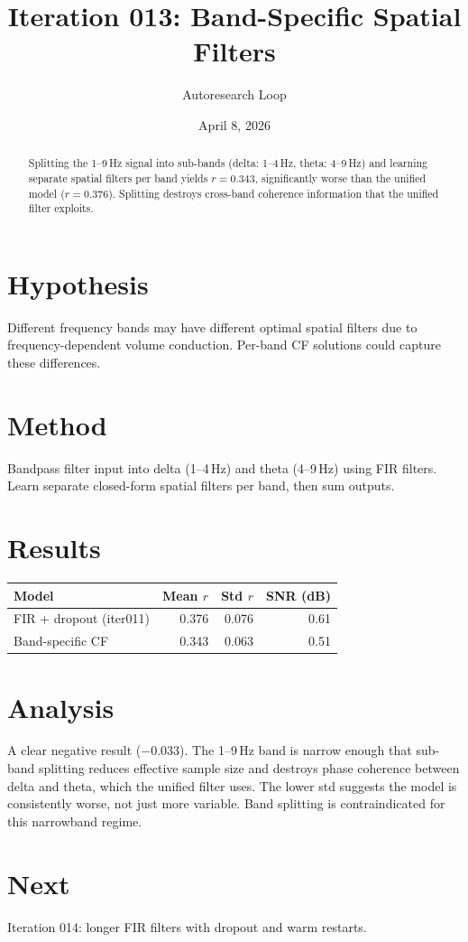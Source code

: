\documentclass[11pt,a4paper]{article}
\title{Iteration 013: Band-Specific Spatial Filters}
\author{Autoresearch Loop}
\date{April 8, 2026}
\begin{document}
\maketitle

\begin{abstract}
Splitting the 1--9\,Hz signal into sub-bands (delta: 1--4\,Hz, theta: 4--9\,Hz)
and learning separate spatial filters per band yields $r=0.343$, significantly
worse than the unified model ($r=0.376$). Splitting destroys cross-band
coherence information that the unified filter exploits.
\end{abstract}

\section{Hypothesis}
Different frequency bands may have different optimal spatial filters due to
frequency-dependent volume conduction. Per-band CF solutions could capture
these differences.

\section{Method}
Bandpass filter input into delta (1--4\,Hz) and theta (4--9\,Hz) using FIR
filters. Learn separate closed-form spatial filters per band, then sum outputs.

\section{Results}
\begin{table}[H]
\centering
\begin{tabular}{lrrr}
\toprule
Model & Mean $r$ & Std $r$ & SNR (dB) \\
\midrule
FIR + dropout (iter011) & 0.376 & 0.076 & 0.61 \\
Band-specific CF & 0.343 & 0.063 & 0.51 \\
\bottomrule
\end{tabular}
\end{table}

\section{Analysis}
A clear negative result ($-$0.033). The 1--9\,Hz band is narrow enough that
sub-band splitting reduces effective sample size and destroys phase coherence
between delta and theta, which the unified filter uses. The lower std suggests
the model is consistently worse, not just more variable. Band splitting is
contraindicated for this narrowband regime.

\section{Next}
Iteration 014: longer FIR filters with dropout and warm restarts.
\end{document}
